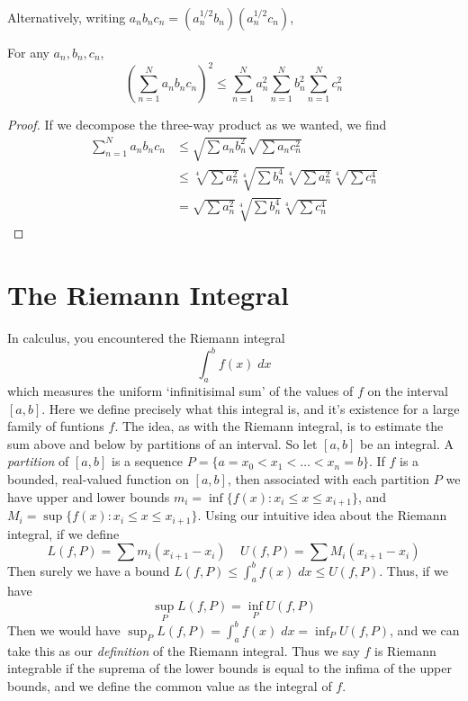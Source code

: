 Alternatively, writing $a_nb_nc_n = (a_n^{1/2}b_n)(a_n^{1/2}c_n)$,

\begin{theorem}
    For any $a_n,b_n,c_n$,
    \[ \left( \sum_{n = 1}^N a_nb_nc_n \right)^2 \leq \sum_{n = 1}^N a_n^2 \sum_{n = 1}^N b_n^2 \sum_{n = 1}^N c_n^2 \]
\end{theorem}
\begin{proof}
    If we decompose the three-way product as we wanted, we find
    \begin{align*}
        \sum_{n = 1}^N a_nb_nc_n &\leq \sqrt{\sum a_nb_n^2} \sqrt{\sum a_nc_n^2}\\
        &\leq \sqrt[4]{\sum a_n^2} \sqrt[4]{\sum b_n^4} \sqrt[4]{\sum a_n^2} \sqrt[4]{\sum c_n^4}\\
        &= \sqrt{\sum a_n^2} \sqrt[4]{\sum b_n^4} \sqrt[4]{\sum c_n^4}
    \end{align*}
\end{proof}






\chapter{The Riemann Integral}

In calculus, you encountered the Riemann integral
%
\[ \int_a^b f(x)\; dx \]
%
which measures the uniform `infinitisimal sum' of the values of $f$ on the interval $[a,b]$. Here we define precisely what this integral is, and it's existence for a large family of funtions $f$. The idea, as with the Riemann integral, is to estimate the sum above and below by partitions of an interval. So let $[a,b]$ be an integral. A {\it partition} of $[a,b]$ is a sequence $P = \{ a = x_0 < x_1 < \dots < x_n = b \}$. If $f$ is a bounded, real-valued function on $[a,b]$, then associated with each partition $P$ we have upper and lower bounds $m_i = \inf \{ f(x): x_i \leq x \leq x_{i+1} \}$, and $M_i = \sup \{ f(x): x_i \leq x \leq x_{i+1} \}$. Using our intuitive idea about the Riemann integral, if we define
%
\[ L(f,P) = \sum m_i (x_{i+1} - x_i)\ \ \ \ \ U(f,P) = \sum M_i (x_{i+1} - x_i) \]
%
Then surely we have a bound $L(f,P) \leq \int_a^b f(x)\; dx \leq U(f,P)$. Thus, if we have
%
\[ \sup_P L(f,P) = \inf_P U(f,P) \]
%
Then we would have $\sup_P L(f,P) = \int_a^b f(x)\; dx = \inf_P U(f,P)$, and we can take this as our {\it definition} of the Riemann integral. Thus we say $f$ is Riemann integrable if the suprema of the lower bounds is equal to the infima of the upper bounds, and we define the common value as the integral of $f$.

